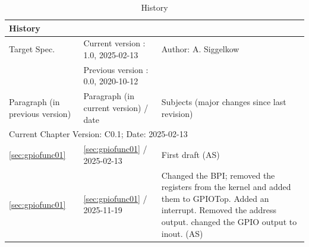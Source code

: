 \begin{table}[H]
\caption{History}
\label{tab:gpiohistory02}
\centering
\begin{tabularx}{\textwidth}{|X |X |X |}
  \hline
  \multicolumn{3}{|l|}{History} \\
  \hline
  \multicolumn{1}{|l}{Target Spec.} & \multicolumn{1}{l}{Current version : 1.0, 2025-02-13} & \multicolumn{1}{l|}{Author: A. Siggelkow}\\
  \multicolumn{1}{|l}{ } & \multicolumn{1}{l}{Previous version : 0.0, 2020-10-12} & \multicolumn{1}{l|}{ }\\
  \hline
  \hline
  Paragraph (in previous version) & Paragraph (in current version) / date & Subjects (major changes since last revision) \\
  \hline
  \hline
  \multicolumn{3}{|l|}{Current Chapter Version: C0.1; Date: 2025-02-13} \\
  \hline
  \ref{sec:gpiofunc01} & \ref{sec:gpiofunc01} / 2025-02-13 & First draft (AS) \\
  \hline
  \ref{sec:gpiofunc01} & \ref{sec:gpiofunc01} / 2025-11-19 & Changed the BPI; removed the registers from the kernel and added them to GPIOTop. Added an interrupt. Removed the address output. changed the GPIO output to inout. (AS) \\
  \hline
\end{tabularx}
\end{table}
